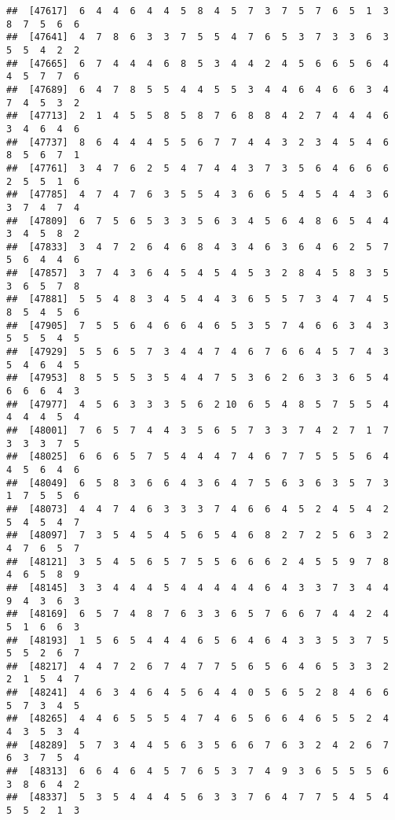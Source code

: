 \documentclass[
]{book}
\begin{document}
\begin{verbatim}
##  [47617]  6  4  4  6  4  4  5  8  4  5  7  3  7  5  7  6  5  1  3  8  7  5  6  6
##  [47641]  4  7  8  6  3  3  7  5  5  4  7  6  5  3  7  3  3  6  3  5  5  4  2  2
##  [47665]  6  7  4  4  4  6  8  5  3  4  4  2  4  5  6  6  5  6  4  4  5  7  7  6
##  [47689]  6  4  7  8  5  5  4  4  5  5  3  4  4  6  4  6  6  3  4  7  4  5  3  2
##  [47713]  2  1  4  5  5  8  5  8  7  6  8  8  4  2  7  4  4  4  6  3  4  6  4  6
##  [47737]  8  6  4  4  4  5  5  6  7  7  4  4  3  2  3  4  5  4  6  8  5  6  7  1
##  [47761]  3  4  7  6  2  5  4  7  4  4  3  7  3  5  6  4  6  6  6  2  5  5  1  6
##  [47785]  4  7  4  7  6  3  5  5  4  3  6  6  5  4  5  4  4  3  6  3  7  4  7  4
##  [47809]  6  7  5  6  5  3  3  5  6  3  4  5  6  4  8  6  5  4  4  3  4  5  8  2
##  [47833]  3  4  7  2  6  4  6  8  4  3  4  6  3  6  4  6  2  5  7  5  6  4  4  6
##  [47857]  3  7  4  3  6  4  5  4  5  4  5  3  2  8  4  5  8  3  5  3  6  5  7  8
##  [47881]  5  5  4  8  3  4  5  4  4  3  6  5  5  7  3  4  7  4  5  8  5  4  5  6
##  [47905]  7  5  5  6  4  6  6  4  6  5  3  5  7  4  6  6  3  4  3  5  5  5  4  5
##  [47929]  5  5  6  5  7  3  4  4  7  4  6  7  6  6  4  5  7  4  3  5  4  6  4  5
##  [47953]  8  5  5  5  3  5  4  4  7  5  3  6  2  6  3  3  6  5  4  6  6  6  4  3
##  [47977]  4  5  6  3  3  3  5  6  2 10  6  5  4  8  5  7  5  5  4  4  4  4  5  4
##  [48001]  7  6  5  7  4  4  3  5  6  5  7  3  3  7  4  2  7  1  7  3  3  3  7  5
##  [48025]  6  6  6  5  7  5  4  4  4  7  4  6  7  7  5  5  5  6  4  4  5  6  4  6
##  [48049]  6  5  8  3  6  6  4  3  6  4  7  5  6  3  6  3  5  7  3  1  7  5  5  6
##  [48073]  4  4  7  4  6  3  3  3  7  4  6  6  4  5  2  4  5  4  2  5  4  5  4  7
##  [48097]  7  3  5  4  5  4  5  6  5  4  6  8  2  7  2  5  6  3  2  4  7  6  5  7
##  [48121]  3  5  4  5  6  5  7  5  5  6  6  6  2  4  5  5  9  7  8  4  6  5  8  9
##  [48145]  3  3  4  4  4  5  4  4  4  4  4  6  4  3  3  7  3  4  4  9  4  3  6  3
##  [48169]  6  5  7  4  8  7  6  3  3  6  5  7  6  6  7  4  4  2  4  5  1  6  6  3
##  [48193]  1  5  6  5  4  4  4  6  5  6  4  6  4  3  3  5  3  7  5  5  5  2  6  7
##  [48217]  4  4  7  2  6  7  4  7  7  5  6  5  6  4  6  5  3  3  2  2  1  5  4  7
##  [48241]  4  6  3  4  6  4  5  6  4  4  0  5  6  5  2  8  4  6  6  5  7  3  4  5
##  [48265]  4  4  6  5  5  5  4  7  4  6  5  6  6  4  6  5  5  2  4  4  3  5  3  4
##  [48289]  5  7  3  4  4  5  6  3  5  6  6  7  6  3  2  4  2  6  7  6  3  7  5  4
##  [48313]  6  6  4  6  4  5  7  6  5  3  7  4  9  3  6  5  5  5  6  3  8  6  4  2
##  [48337]  5  3  5  4  4  4  5  6  3  3  7  6  4  7  7  5  4  5  4  5  5  2  1  3

\end{verbatim}
\end{document}
